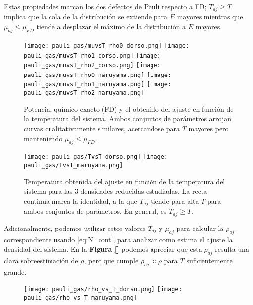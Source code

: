 Estas propiedades marcan los dos defectos de Pauli respecto a FD; $T_{aj}\geq T$ implica que la cola de la distribución se extiende para $E$ mayores mientras que $\mu_{aj}\leq\mu_{FD}$ tiende a
desplazar el máximo de la distribución a $E$ mayores.

\begin{figure}[H]
	\centering
	\texttt{[image: pauli\_gas/muvsT\_rho0\_dorso.png]}
	\texttt{[image: pauli\_gas/muvsT\_rho1\_dorso.png]}
	\texttt{[image: pauli\_gas/muvsT\_rho2\_dorso.png]}
	\texttt{[image: pauli\_gas/muvsT\_rho0\_maruyama.png]}
	\texttt{[image: pauli\_gas/muvsT\_rho1\_maruyama.png]}
	\texttt{[image: pauli\_gas/muvsT\_rho2\_maruyama.png]}
	\caption{Potencial químico exacto (FD) y el obtenido del ajuste en función de la temperatura del sistema.
  Ambos conjuntos de parámetros arrojan curvas cualitativamente similares, acercandose para $T$ mayores pero manteniendo $\mu_{aj}\leq \mu_{FD}$.}
	\label{fig:muvsT}
\end{figure}
\begin{figure}[H]
	\centering
	\texttt{[image: pauli\_gas/TvsT\_dorso.png]}
	\texttt{[image: pauli\_gas/TvsT\_maruyama.png]}
	\caption{Temperatura obtenida del ajuste en función de la temperatura del sistema para las 3 densidades reducidas estudiadas.
  La recta continua marca la identidad, a la que $T_{aj}$ tiende para alta $T$ para ambos conjuntos de parámetros.
  En general, es $T_{aj}\geq T$.}
	\label{fig:TvsT}
\end{figure}

Adicionalmente, podemos utilizar estos valores $T_{aj}$ y $\mu_{aj}$ para calcular la $\rho_{aj}$ correspondiente usando \eqref{eq:N_cont}, para analizar como estima el ajuste la densidad del sistema.
En la \textbf{Figura \ref{}} podemos apreciar que esta $\rho_{aj}$ resulta una clara sobreestimación de $\rho$, pero que cumple $\rho_{aj}\approx\rho$ para $T$ suficientemente grande.

\begin{figure}[H]
	\centering
	\texttt{[image: pauli\_gas/rho\_vs\_T\_dorso.png]}
	\texttt{[image: pauli\_gas/rho\_vs\_T\_maruyama.png]}
	\caption{}
	\label{fig:rhovsT}
\end{figure}

